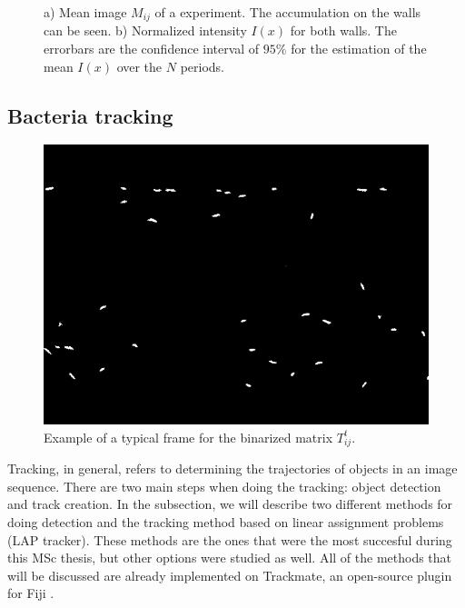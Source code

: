 \begin{figure}
	\centering
	
	\caption[Mean image and profile of an experiment]{a) Mean image $M_{ij}$ of a experiment. The accumulation on the walls can be seen. b) Normalized intensity $I(x)$ for both walls. The errorbars are the confidence interval of $95\%$ for the estimation of the mean $I(x)$ over the $N$ periods.}
	\label{mean_image_and_profile}
\end{figure}

\newpage

\subsection{Bacteria tracking}

\begin{figure}
\centering
\includegraphics[width=\linewidth,angle=0]{imagenes/track_video_frame.PNG}
\caption[Tracking video frame]{Example of a typical frame for the binarized matrix $T_{ij}^t$.}
\label{tracking_video_frame}
\end{figure}


Tracking, in general, refers to determining the trajectories of objects in an image sequence. There are two main steps when doing the tracking: object detection and track creation. In the subsection, we will describe two different methods for doing detection and the tracking method based on linear assignment problems (LAP tracker). These methods are the ones that were the most succesful during this MSc thesis, but other options were studied as well. All of the methods that will be discussed are already implemented on Trackmate, an open-source plugin for Fiji \cite{Tinevez2017TrackMate:Tracking}. 


